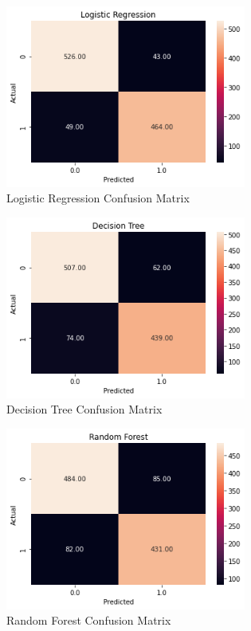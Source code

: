 \documentclass[conference]{IEEEtran}
\begin{document}
\begin{figure}[!ht]
  \begin{center}
 \includegraphics[height=6cm]{graphics/lr_cm.png}
 \caption{Logistic Regression Confusion Matrix}
 \label{Logistic Regression Confusion Matrix}
 \end{center}
\end{figure}

\begin{figure}[!ht]
  \begin{center}
 \includegraphics[height=6cm]{graphics/dt_cm.png}
 \caption{Decision Tree Confusion Matrix}
 \label{Decision Tree Confusion Matrix}
 \end{center}
\end{figure}

\begin{figure}[!ht]
  \begin{center}
 \includegraphics[height=6cm]{graphics/rf_cm.png}
 \caption{Random Forest Confusion Matrix}
 \label{Random Forest Confusion Matrix}
 \end{center}
\end{figure}
\end{document}
